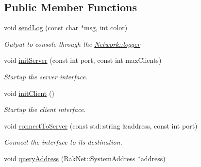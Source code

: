 \subsection*{Public Member Functions}
\begin{DoxyCompactItemize}
\item 
\hypertarget{class_champ_net_1_1_network_a3d25e6581e6a53201de1f68ed266724e}{void \hyperlink{class_champ_net_1_1_network_a3d25e6581e6a53201de1f68ed266724e}{send\-Log} (const char $\ast$msg, int color)}\label{class_champ_net_1_1_network_a3d25e6581e6a53201de1f68ed266724e}

\begin{DoxyCompactList}\small\item\em Output to console through the \hyperlink{class_champ_net_1_1_network_a4588391c9f6064ad7fb83a08f0ea02c6}{Network\-::logger} \end{DoxyCompactList}\item 
\hypertarget{class_champ_net_1_1_network_ac0d53751c94ef1df4cee9ce3719432bf}{void \hyperlink{class_champ_net_1_1_network_ac0d53751c94ef1df4cee9ce3719432bf}{init\-Server} (const int port, const int max\-Clients)}\label{class_champ_net_1_1_network_ac0d53751c94ef1df4cee9ce3719432bf}

\begin{DoxyCompactList}\small\item\em Startup the server interface. \end{DoxyCompactList}\item 
\hypertarget{class_champ_net_1_1_network_af7bda654a247a00e46d6adcc87c8d65b}{void \hyperlink{class_champ_net_1_1_network_af7bda654a247a00e46d6adcc87c8d65b}{init\-Client} ()}\label{class_champ_net_1_1_network_af7bda654a247a00e46d6adcc87c8d65b}

\begin{DoxyCompactList}\small\item\em Startup the client interface. \end{DoxyCompactList}\item 
\hypertarget{class_champ_net_1_1_network_a9dbfd1e6e9e5f11720a6e8e41174df1e}{void \hyperlink{class_champ_net_1_1_network_a9dbfd1e6e9e5f11720a6e8e41174df1e}{connect\-To\-Server} (const std\-::string \&address, const int port)}\label{class_champ_net_1_1_network_a9dbfd1e6e9e5f11720a6e8e41174df1e}

\begin{DoxyCompactList}\small\item\em Connect the interface to its destination. \end{DoxyCompactList}\item 
\hypertarget{class_champ_net_1_1_network_a9cde161aafa694e5fef8d1c3fac3edd3}{void \hyperlink{class_champ_net_1_1_network_a9cde161aafa694e5fef8d1c3fac3edd3}{query\-Address} (Rak\-Net\-::\-System\-Address $\ast$address)}\label{class_champ_net_1_1_network_a9cde161aafa694e5fef8d1c3fac3edd3}


\end{DoxyCompactItemize}
